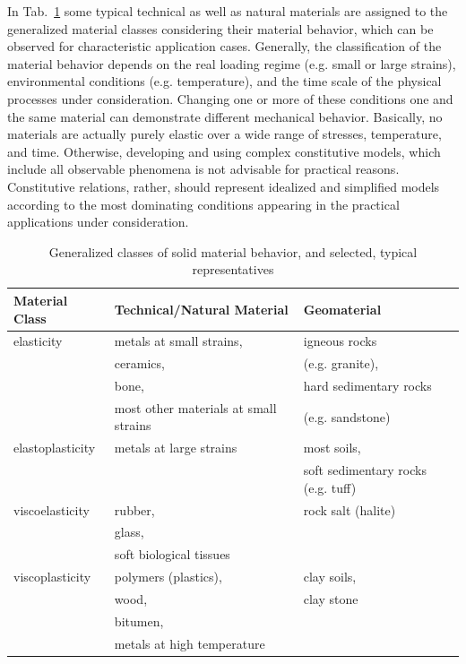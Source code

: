 In Tab.~\ref{tab:matclass} some typical technical as well as natural materials are assigned to the generalized material classes considering their material behavior, which can be observed for characteristic application cases. Generally, the classification of the material behavior depends on the real loading regime (e.g. small or large strains), environmental conditions (e.g. temperature), and the time scale of the physical processes under consideration. Changing one or more of these conditions one and the same material can demonstrate different mechanical behavior. Basically, no materials are actually purely elastic over a wide range of stresses, temperature, and time. Otherwise, developing and using complex constitutive models, which include all observable phenomena is not advisable for practical reasons. Constitutive relations, rather, should represent idealized and simplified models according to the most dominating conditions appearing in the practical applications under consideration.

\renewcommand{\arraystretch}{1.25}
\begin{table}[htb!]
\caption{Generalized classes of solid material behavior, and selected, typical representatives}
\label{tab:matclass}
\begin{center}
\begin{tabular}{|p{}||p{}|p{}|}
\hline
Material Class & Technical/Natural Material & Geomaterial \\
\hline\hline
elasticity & metals at small strains, & igneous rocks                 \\
           & ceramics,                & (e.g. granite),               \\
           & bone,                    & hard sedimentary rocks        \\
           & most other materials at small strains & (e.g. sandstone) \\
\hline
elastoplasticity & metals at large strains & most soils,                        \\
                 &                         & soft sedimentary rocks (e.g. tuff) \\
\hline
viscoelasticity & rubber,                 & rock salt (halite) \\
                & glass,                  &                    \\
                & soft biological tissues &                    \\
\hline
viscoplasticity & polymers (plastics),       & clay soils, \\
                & wood,                      & clay stone  \\
                & bitumen,                   &             \\
                & metals at high temperature &             \\
\hline
\end{tabular}
\end{center}
\end{table}
\renewcommand{\arraystretch}{1.00}
%

